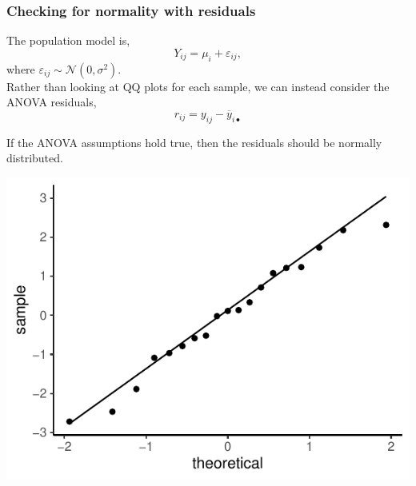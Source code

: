 \documentclass[a4paper]{article}
\begin{document}
\subsubsection{Checking for normality with residuals}
The population model is,
\[
	Y_{ij} = \mu_i + \varepsilon_{ij},
\]
where \( \varepsilon_{ij} \sim \mathcal{N} (0,\sigma^2) \).\\
Rather than looking at QQ plots for each sample, we can instead consider the ANOVA residuals,
\[
	r_{ij} = y_{ij} - \overline{y}_{i\bullet}
\]
\begin{goldbox}
	If the ANOVA assumptions hold true, then the residuals should be normally distributed.
\end{goldbox}
\begin{Schunk}


{\centering \includegraphics[width=\maxwidth]{figure/listings-unnamed-chunk-239-1} 

}

\end{Schunk}
\end{document}
